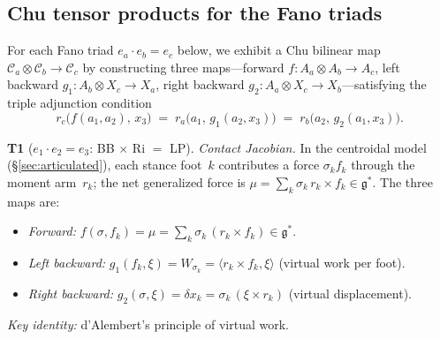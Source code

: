 \subsection*{Chu tensor products for the Fano triads}

\begin{theorem}\label{thm:fano-triads}
For each Fano triad $e_a \cdot e_b = e_c$ below, we exhibit a
Chu bilinear map
$\mathcal{C}_a \otimes \mathcal{C}_b \to \mathcal{C}_c$
by constructing three maps---forward $f\colon A_a \otimes A_b \to A_c$,
left backward $g_1\colon A_b \otimes X_c \to X_a$,
right backward $g_2\colon A_a \otimes X_c \to X_b$---satisfying
the triple adjunction condition
\begin{equation}\label{eq:triple-adjunction}
  r_c\!\bigl(f(a_1, a_2),\, x_3\bigr)
  \;=\; r_a\!\bigl(a_1,\, g_1(a_2, x_3)\bigr)
  \;=\; r_b\!\bigl(a_2,\, g_2(a_1, x_3)\bigr).
\end{equation}

\medskip\noindent
\textbf{T1}\; ($e_1 \cdot e_2 = e_3$: BB $\times$ Ri $=$ LP).
\emph{Contact Jacobian.}\;
In the centroidal model (\S\ref{sec:articulated}), each stance
foot~$k$ contributes a force $\sigma_k f_k$ through the moment
arm~$r_k$; the net generalized force is
$\mu = \sum_k \sigma_k\, r_k \times f_k \in \mathfrak{g}^*$.
The three maps are:
\begin{itemize}[nosep]
\item \emph{Forward:}\;
  $f(\sigma, f_k) = \mu = \sum_k \sigma_k\,(r_k \times f_k)
  \in \mathfrak{g}^*$.
\item \emph{Left backward:}\;
  $g_1(f_k, \xi) = W_{\sigma_k} = \langle r_k \times f_k, \xi \rangle$
  \quad (virtual work per foot).
\item \emph{Right backward:}\;
  $g_2(\sigma, \xi) = \delta x_k = \sigma_k\,(\xi \times r_k)$
  \quad (virtual displacement).
\end{itemize}
\emph{Key identity:} d'Alembert's principle of virtual work.


\end{theorem}
